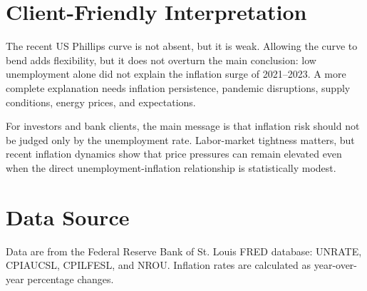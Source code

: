 \documentclass[11pt]{article}
\begin{document}
\section*{Client-Friendly Interpretation}
The recent US Phillips curve is not absent, but it is weak. Allowing the curve to bend adds flexibility, but it does not overturn the main conclusion: low unemployment alone did not explain the inflation surge of 2021--2023. A more complete explanation needs inflation persistence, pandemic disruptions, supply conditions, energy prices, and expectations.

For investors and bank clients, the main message is that inflation risk should not be judged only by the unemployment rate. Labor-market tightness matters, but recent inflation dynamics show that price pressures can remain elevated even when the direct unemployment-inflation relationship is statistically modest.

\section*{Data Source}
Data are from the Federal Reserve Bank of St. Louis FRED database: UNRATE, CPIAUCSL, CPILFESL, and NROU. Inflation rates are calculated as year-over-year percentage changes.
\end{document}
